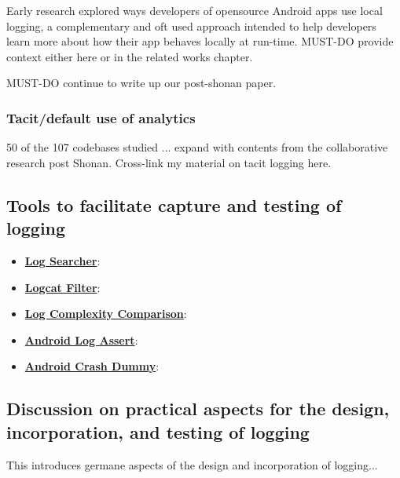 Early research explored ways developers of opensource Android apps use local logging, a complementary and oft used approach intended to help developers learn more about how their app behaves locally at run-time. MUST-DO provide context either here or in the related works chapter.



MUST-DO continue to write up our post-shonan paper.



\subsubsection{Tacit/default use of analytics}
50 of the 107 codebases studied ... expand with contents from the collaborative research post Shonan. Cross-link my material on tacit logging here.

\subsection{Tools to facilitate capture and testing of logging}

\begin{itemize}
    \item \href{https://github.com/ISNIT0/log-searcher}{\textbf{Log Searcher}}:
    \item \href{https://github.com/ISNIT0/logcat-filter}{\textbf{Logcat Filter}}:
    \item \href{https://github.com/ISNIT0/log-complexity-comparison}{\textbf{Log Complexity Comparison}}:
    \item \href{https://github.com/ISNIT0/AndroidLogAssert}{\textbf{Android Log Assert}}:
    \item \href{https://github.com/ISNIT0/AndroidCrashDummy}{\textbf{Android Crash Dummy}}:
\end{itemize}



\subsection{Discussion on practical aspects for the design, incorporation, and testing of logging} \label{apx:practical-aspects-for-design-and-incorporation-of-logging}
This introduces germane aspects of the design and incorporation of logging...



